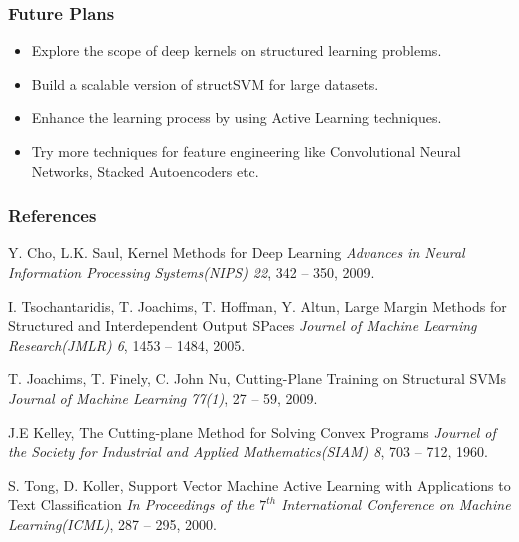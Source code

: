 \documentclass{beamer}
\begin{document}
\begin{frame}
\frametitle{Future Plans}
\begin{itemize}
\item Explore the scope of deep kernels on structured learning problems.

\item Build a scalable version of structSVM for large datasets.

\item Enhance the learning process by using Active Learning techniques.

\item Try more techniques for feature engineering like Convolutional Neural Networks, Stacked Autoencoders etc.
\end{itemize}

\end{frame}

\begin{frame}
\frametitle{References}
\footnotesize{
\begin{thebibliography}{99} %
 Y. Cho, L.K. Saul, Kernel Methods  for Deep Learning
\newblock \emph{Advances in Neural Information Processing Systems(NIPS) 22}, 342 -- 350, 2009.

 I. Tsochantaridis, T. Joachims, T. Hoffman, Y. Altun, Large Margin Methods for Structured and Interdependent Output SPaces
\newblock \emph{Journel of Machine Learning Research(JMLR) 6}, 1453 -- 1484, 2005.

 T. Joachims, T. Finely, C. John Nu, Cutting-Plane Training on Structural SVMs
\newblock \emph{Journal of Machine Learning 77(1)}, 27 -- 59, 2009.

 J.E Kelley, The Cutting-plane Method for Solving Convex Programs
\newblock \emph{Journel of the Society for Industrial and Applied Mathematics(SIAM) 8}, 703 -- 712, 1960.

 S. Tong, D. Koller, Support Vector Machine Active Learning with Applications to Text Classification
\newblock \emph{In Proceedings of the $7^{th}$ International Conference on Machine Learning(ICML)}, 287 -- 295, 2000.


\end{thebibliography}
}
\end{frame}

\iffalse
\end{document}
